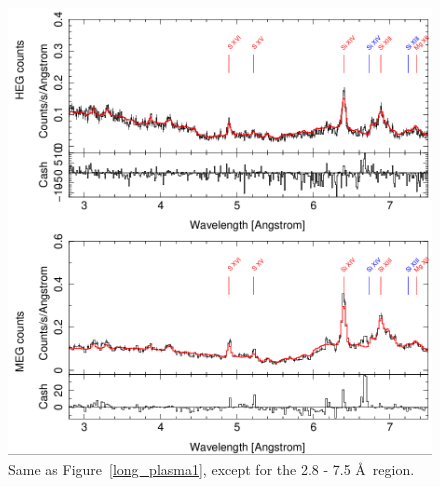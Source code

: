 \begin{figure}
    \centering
    \includegraphics[width = \linewidth]{Chapters/Figures/long_plasma_whole2.png}
    \caption{Same as Figure~\ref{long_plasma1}, except for the 2.8 - 7.5 \AA\ region. }
    \label{long_plasma2}
\end{figure}


